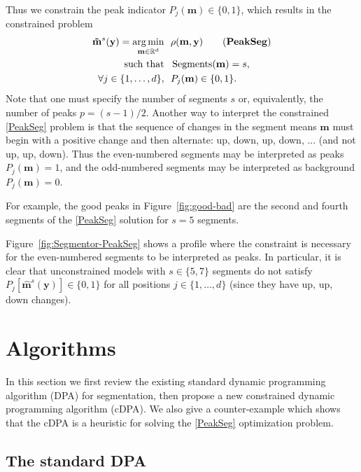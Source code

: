 \documentclass{article}
\DeclareMathOperator*{\argmin}{arg\,min}
\DeclareMathOperator*{\Segments}{Segments}
\newcommand{\RR}{\mathbb R}
\begin{document}

Thus we constrain the peak indicator $P_j(\mathbf
m)\in\{0, 1\}$, which results
in the constrained problem
\begin{align*}
  \label{PeakSeg}
  \mathbf{\tilde m}^s(\mathbf y)  =
    \argmin_{\mathbf m\in\RR^{d}} &\ \ 
    \rho(\mathbf m, \mathbf y) 
    \tag{\textbf{PeakSeg}}
\\
    \text{such that} &\ \  \Segments(\mathbf m)=s,  \\
     \forall j\in\{1, \dots, d\}, &\ \ P_j(\mathbf m) \in\{0, 1\}.
\end{align*}
Note that one must specify the number of segments $s$ or,
equivalently, the number of peaks $p=(s-1)/2$. Another way to
interpret the constrained \ref{PeakSeg} problem is that the sequence
of changes in the segment means $\mathbf m$ must begin with a positive
change and then alternate: up, down, up, down, ... (and not up, up,
down). Thus the even-numbered segments may be interpreted as peaks
$P_j(\mathbf m)=1$, and the odd-numbered segments may be interpreted
as background $P_j(\mathbf m)=0$.

For example, the good peaks in Figure~\ref{fig:good-bad} are the
second and fourth segments of the \ref{PeakSeg} solution for $s=5$
segments.

Figure~\ref{fig:Segmentor-PeakSeg} shows a profile where the constraint is
necessary for the even-numbered segments to be interpreted as
peaks. In particular, it is clear that unconstrained models with
$s\in\{5, 7\}$ segments do not satisfy $P_j[\mathbf{\hat m}^s(\mathbf
y)]\in\{0, 1\}$ for all positions $j\in\{1,\dots, d\}$ (since they
have up, up, down changes).

\section{Algorithms}
\label{sec:algorithms}

In this section we first review the existing standard dynamic
programming algorithm (DPA) for segmentation, then propose a new
constrained dynamic programming algorithm (cDPA). We also give a
counter-example which shows that the cDPA is a heuristic for solving
the \ref{PeakSeg} optimization problem.

\subsection{The standard DPA}
\end{document}
